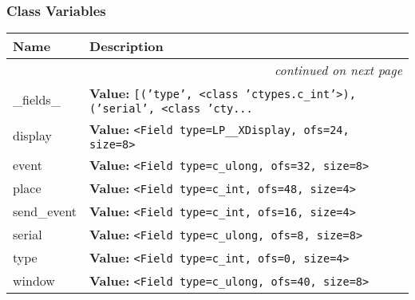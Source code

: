 
  \subsubsection{Class Variables}

    \vspace{-1cm}
\hspace{\varindent}\begin{longtable}{|p{\varnamewidth}|p{\vardescrwidth}|l}
\cline{1-2}
\cline{1-2} \centering \textbf{Name} & \centering \textbf{Description}& \\
\cline{1-2}
\endhead\cline{1-2}\multicolumn{3}{r}{\small\textit{continued on next page}}\\\endfoot\cline{1-2}
\endlastfoot\raggedright \_\-f\-i\-e\-l\-d\-s\-\_\- & \raggedright \textbf{Value:} 
{\tt \texttt{[}\texttt{(}\texttt{'}\texttt{type}\texttt{'}\texttt{, }{\textless}class 'ctypes.c\_int'{\textgreater}\texttt{)}\texttt{, }\texttt{(}\texttt{'}\texttt{serial}\texttt{'}\texttt{, }{\textless}class 'cty\texttt{...}}&\\
\cline{1-2}
\raggedright d\-i\-s\-p\-l\-a\-y\- & \raggedright \textbf{Value:} 
{\tt {\textless}Field type=LP\_\_XDisplay, ofs=24, size=8{\textgreater}}&\\
\cline{1-2}
\raggedright e\-v\-e\-n\-t\- & \raggedright \textbf{Value:} 
{\tt {\textless}Field type=c\_ulong, ofs=32, size=8{\textgreater}}&\\
\cline{1-2}
\raggedright p\-l\-a\-c\-e\- & \raggedright \textbf{Value:} 
{\tt {\textless}Field type=c\_int, ofs=48, size=4{\textgreater}}&\\
\cline{1-2}
\raggedright s\-e\-n\-d\-\_\-e\-v\-e\-n\-t\- & \raggedright \textbf{Value:} 
{\tt {\textless}Field type=c\_int, ofs=16, size=4{\textgreater}}&\\
\cline{1-2}
\raggedright s\-e\-r\-i\-a\-l\- & \raggedright \textbf{Value:} 
{\tt {\textless}Field type=c\_ulong, ofs=8, size=8{\textgreater}}&\\
\cline{1-2}
\raggedright t\-y\-p\-e\- & \raggedright \textbf{Value:} 
{\tt {\textless}Field type=c\_int, ofs=0, size=4{\textgreater}}&\\
\cline{1-2}
\raggedright w\-i\-n\-d\-o\-w\- & \raggedright \textbf{Value:} 
{\tt {\textless}Field type=c\_ulong, ofs=40, size=8{\textgreater}}&\\
\cline{1-2}
\end{longtable}

